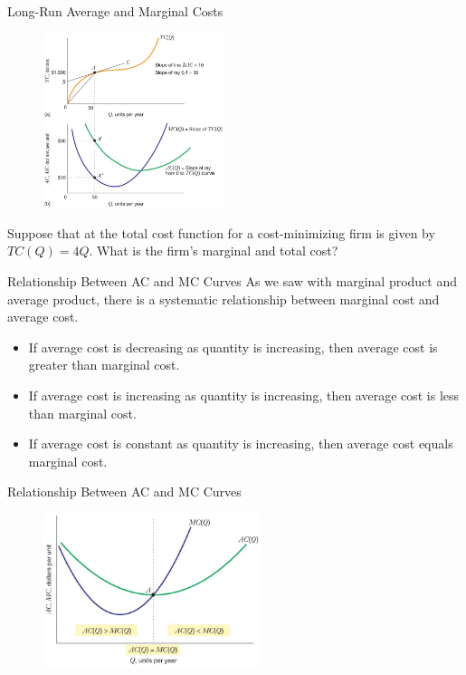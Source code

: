 \documentclass[11pt,t]{beamer}
\begin{document}
\begin{frame}{Long-Run Average and Marginal Costs}
  \begin{figure}
    \includegraphics[width=200px]{figures/fig8_7.jpg}
  \end{figure}
\end{frame}

\begin{frame}{}
  \bigskip
  Suppose that at the total cost function for a cost-minimizing firm is given by $TC(Q) = 4Q$. What is the firm's marginal and total cost?
\end{frame}

\begin{frame}{Relationship Between AC and MC Curves}
  As we saw with marginal product and average product, there is a systematic relationship between marginal cost and average cost.

  \begin{itemize}
    \item If average cost is decreasing as quantity is increasing, then average cost is greater than marginal cost.

    \item If average cost is increasing as quantity is increasing, then average cost is less than marginal cost.

    \item If average cost is constant as quantity is increasing, then average cost equals marginal cost.
  \end{itemize}
\end{frame}

\begin{frame}{Relationship Between AC and MC Curves}
  \begin{figure}
    \includegraphics[width=240px]{figures/fig8_9.jpg}
  \end{figure}
\end{frame}
\end{document}
